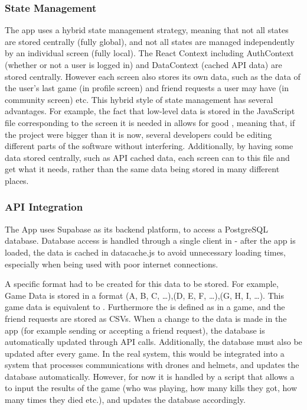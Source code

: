 \documentclass{report_template_oxford}
\begin{document}
\subsubsection{State Management}
The app uses a hybrid state management strategy, meaning that not all states are stored centrally (fully global), and not all states are managed independently by an individual screen (fully local). The React Context including AuthContext (whether or not a user is logged in) and DataContext (cached API data) are stored centrally. However each screen also stores its own data, such as the data of the user's last game (in profile screen) and friend requests a user may have (in community screen) etc. This hybrid style of state management has several advantages. For example, the fact that low-level data is stored in the JavaScript file corresponding to the screen it is needed in allows for good , meaning that, if the project were bigger than it is now, several developers could be editing different parts of the software without interfering. Additionally, by having some data stored centrally, such as API cached data, each screen can  to this file and get what it needs, rather than the same data being stored in many different places.
\subsubsection{API Integration}
The App uses Supabase as its backend platform, to access a PostgreSQL database. Database access is handled through a single client in  - after the app is loaded, the data is cached in datacache.js to avoid unnecessary loading times, especially when being used with poor internet connections.

\(\)\newline A specific format had to be created for this data to be stored. For example, Game Data is stored in a format (A, B, C, \dots),(D, E, F, \dots),(G, H, I, \dots). This game data is equivalent to . Furthermore the  is defined as  in a game, and the friend requests are stored as CSVs. When a change to the data is made in the app (for example sending or accepting a friend request), the database is automatically updated through API calls. Additionally, the database must also be updated after every game. In the real system, this would be integrated into a system that processes communications with drones and helmets, and updates the database automatically. However, for now it is handled by a script that allows a  to input the results of the game (who was playing, how many kills they got, how many times they died etc.), and updates the database accordingly. 
\end{document}
